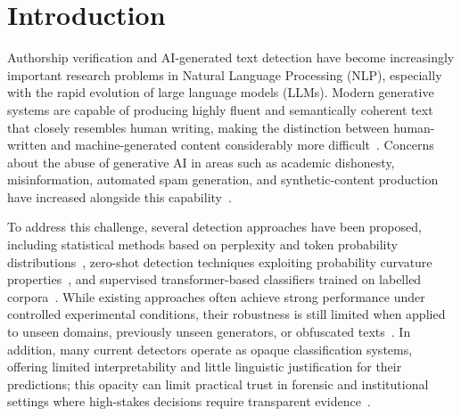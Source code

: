 \documentclass[]{ceurart}
\begin{document}
\maketitle

\section{Introduction}

Authorship verification and AI-generated text detection have become increasingly important research problems in Natural Language Processing (NLP), especially with the rapid evolution of large language models (LLMs). Modern generative systems are capable of producing highly fluent and semantically coherent text that closely resembles human writing, making the distinction between human-written and machine-generated content considerably more difficult~\cite{geminiteam2023gemini,openai2023gpt4,touvron2023llama2}. Concerns about the abuse of generative AI in areas such as academic dishonesty, misinformation, automated spam generation, and synthetic-content production have increased alongside this capability~\cite{clark2021humans,solaiman2019release}.

To address this challenge, several detection approaches have been proposed, including statistical methods based on perplexity and token probability distributions~\cite{gehrmann2019gltr}, zero-shot detection techniques exploiting probability curvature properties~\cite{mitchell2023detectgpt}, and supervised transformer-based classifiers trained on labelled corpora~\cite{jawahar2020survey}. While existing approaches often achieve strong performance under controlled experimental conditions, their robustness is still limited when applied to unseen domains, previously unseen generators, or obfuscated texts~\cite{krishna2023paraphrasing}. In addition, many current detectors operate as opaque classification systems, offering limited interpretability and little linguistic justification for their predictions; this opacity can limit practical trust in forensic and institutional settings where high-stakes decisions require transparent evidence~\cite{rudin2019stop}.
\end{document}
